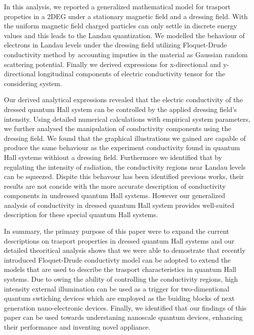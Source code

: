 In this analysis, we reported a generalized mathematical model for trasport propeties in a 2DEG under a stationary magnetic field and a dressing field. With the uniform magnetic field charged particles can only settle in discrete energy values and this leads to the Landau quantization. We modelled the behaviour of electrons in Landau levels under the dressing field utilizing Floquet-Drude conductivity method by accounting imputies in the material as Gaussian random scattering potential. Finally we derived expressions for x-directional and y-directional longitudinal components of electric conductivity tensor for the considering system.

Our derived analytical expressions revealed that the electric conductivity of the dressed quantum Hall system can be controlled by the applied dressing field’s intensity. Using detailed numerical calculations with empirical system parameters, we further analysed the manipulation of conductivity components using the dressing field. We found that the graphical illustrations we gained are capable of produce the same behaviour as the experiment conductivity found in quantum Hall systems withiout a dressing field. Furthermore we identified that by regulating the intensity of radiation, the conductivity regions near Landau levels can be squeezed. Dispite this behavour has been identified previous works, their results are not concide with the more accurate description of conductivity components in undressed quantum Hall systems. However our generalized analysis of conductivity in dressed quantum Hall system provides well-suited description for  these special quantum Hall systems.

In summary, the primary purpose of this paper were to expand the current descriptions on trasport properties in dressed quantum Hall systems and our  detailed theoritical analysis shows that we were able to demostrate that recently introduced Floquet-Drude conductivty model can be adopted to extend the models that are used to describe the trasport characteristics in quantum Hall systems. Due to owing the ability of controlling the conductivity regions, high intensity external illumination can be used as a trigger for two-dimentional quantum swtiching devices which are employed as the buiding blocks of next generation nano-electronic devices. Finally, we identified that our findings of this paper can be used towards understaning nanoscale quantum devices, enhancing their performance and inventing novel appliance.
